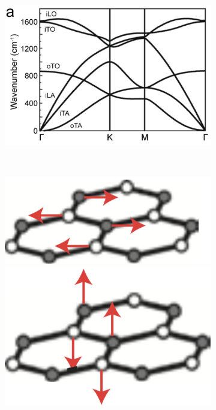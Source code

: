 \begin{figure}[!h]
  \centering
  \begin{subfigure}{0.7\textwidth}
    \includegraphics[width=\textwidth]{./images/phonon-modes.png}
  \end{subfigure}
  ~
  \begin{subfigure}{0.25\textwidth}
    \includegraphics[width=\textwidth]{./images/g-mode-phonon.png}
    \includegraphics[width=\textwidth]{./images/g-mode-phonon-2.png}

\end{subfigure}
\end{figure}
